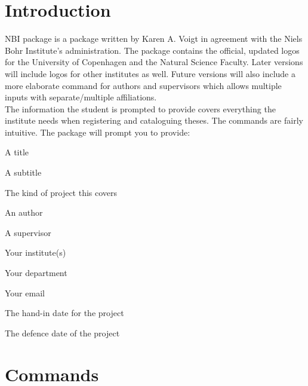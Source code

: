 \section*{Introduction}

NBI package is a package written by Karen A. Voigt in agreement with the Niels Bohr Institute's administration. The package contains the official, updated logos for the University of Copenhagen and the Natural Science Faculty. Later versions will include logos for other institutes as well. Future versions will also include a more elaborate command for authors and supervisors which allows multiple inputs with separate/multiple affiliations.\\

The information the student is prompted to provide covers everything the institute needs when registering and cataloguing theses. The commands are fairly intuitive. The package will prompt you to provide:\\

\begin{compactitem}[-]
\item A title
\item A subtitle
\item The kind of project this covers
\item An author
\item A supervisor
\item Your institute(s)
\item Your department
\item Your email
\item The hand-in date for the project
\item The defence date of the project
\end{compactitem}

\section*{Commands}

